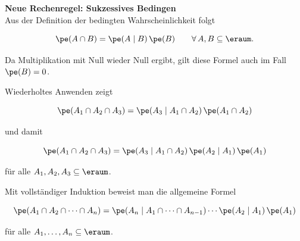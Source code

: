 \begin{reg}
    \textbf{Neue Rechenregel: Sukzessives Bedingen}   \\
    Aus der Definition der bedingten Wahrscheinlichkeit folgt

    \[
        \pe(A \cap B) = \pe(A \mid B)\,\pe(B)
        \qquad \forall\, A,B \subseteq \eraum.
    \]

    Da Multiplikation mit Null wieder Null ergibt, gilt diese Formel auch im Fall
    \(\pe(B)=0\).
    \txo{
        \[
            \pe(B)=0 \Rightarrow \pe(A \cap B) \leq \pe(B) = 0 \Rightarrow \pe(A \cap B) = 0
        \]
    }

    Wiederholtes Anwenden zeigt

    \[
        \pe(A_1 \cap A_2 \cap A_3)
        =
        \pe(A_3 \mid A_1 \cap A_2)\,\pe(A_1 \cap A_2)
    \]

    und damit

    \[
        \pe(A_1 \cap A_2 \cap A_3)
        =
        \pe(A_3 \mid A_1 \cap A_2)\,
        \pe(A_2 \mid A_1)\,
        \pe(A_1)
    \]

    für alle \(A_1, A_2, A_3 \subseteq \eraum\).

    Mit vollständiger Induktion beweist man die allgemeine Formel

    \[
        \pe(A_1 \cap A_2 \cap \cdots \cap A_n)
        =
        \pe(A_n \mid A_1 \cap \cdots \cap A_{n-1})
        \cdots
        \pe(A_2 \mid A_1)\,
        \pe(A_1)
    \]

    für alle \(A_1,\dots,A_n \subseteq \eraum\).
\end{reg}
